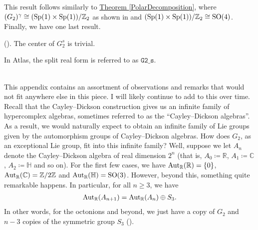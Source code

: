 \noindent This result follows similarly to \hyperref[PolarDecomposition]{Theorem \ref*{PolarDecomposition}}, where $(G_2)^\gamma \cong (\textup{Sp}(1) \times \textup{Sp}(1))/\mathbb{Z}_2$ as shown in \cite[Theorem 1.10.1]{Yok25} and $(\textup{Sp}(1) \times \textup{Sp}(1))/\mathbb{Z}_2 \cong \textup{SO}(4)$. Finally, we have one last result.\\

\noindent\begin{theorem}\textup{(\cite[Theorem 1.13.2]{Yok25}).} The center of $G_2^s$ is trivial.\\
\end{theorem}

\noindent In Atlas, the split real form is referred to as $\texttt{G2\_s}$.

\newpage
\renewcommand\thesection{A}
\noindent\\ This appendix contains an assortment of observations and remarks that would not fit anywhere else in this piece. I will likely continue to add to this over time.\\

\noindent Recall that the Cayley--Dickson construction gives us an infinite family of hypercomplex algebras, sometimes referred to as the ``Cayley--Dickson algebras''. As a result, we would naturally expect to obtain an infinite family of Lie groups given by the automorphism groups of Cayley--Dickson algebras. How does $G_2$, as an exceptional Lie group, fit into this infinite family? Well, suppose we let $A_n$ denote the Cayley--Dickson algebra of real dimension $2^n$ (that is, $A_0 \coloneqq \mathbb{R}$, $A_1 \coloneqq \mathbb{C}$, $A_2 \coloneqq \mathbb{H}$ and so on). For the first few cases, we have $\textup{Aut}_\mathbb{R}(\mathbb{R}) = \{0\}$, $\textup{Aut}_\mathbb{R}(\mathbb{C}) = \mathbb{Z}/2\mathbb{Z}$ and $\textup{Aut}_\mathbb{R}(\mathbb{H}) = \textup{SO}(3)$. However, beyond this, something quite remarkable happens. In particular, for all $n \geq 3$, we have
\begin{align*}
\begin{split}
\textup{Aut}_\mathbb{R}(A_{n+1}) = \textup{Aut}_\mathbb{R}(A_n) \oplus S_3.
\end{split}
\end{align*}
\noindent In other words, for the octonions and beyond, we just have a copy of $G_2$ and $n-3$ copies of the symmetric group $S_3$ (\cite{ES90}).\\

